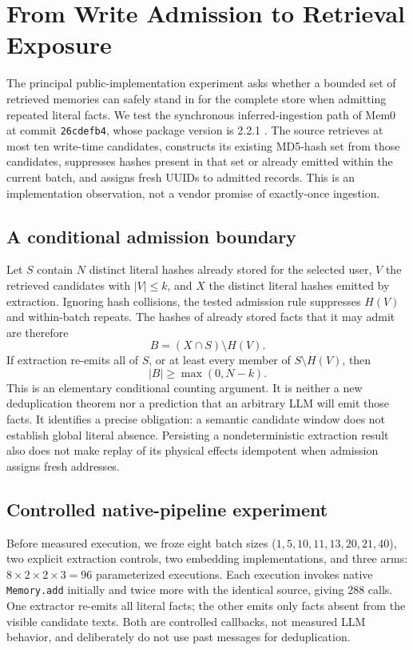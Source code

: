 \section{From Write Admission to Retrieval Exposure}
\label{sec:admission}
The principal public-implementation experiment asks whether a bounded set of retrieved memories can safely stand in for the complete store when admitting repeated literal facts. We test the synchronous inferred-ingestion path of Mem0 at commit \texttt{26cdefb4}, whose package version is 2.2.1 \cite{mem0contributors2026oss}. The source retrieves at most ten write-time candidates, constructs its existing MD5-hash set from those candidates, suppresses hashes present in that set or already emitted within the current batch, and assigns fresh UUIDs to admitted records. This is an implementation observation, not a vendor promise of exactly-once ingestion.

\subsection{A conditional admission boundary}
Let $S$ contain $N$ distinct literal hashes already stored for the selected user, $V$ the retrieved candidates with $|V|\leq k$, and $X$ the distinct literal hashes emitted by extraction. Ignoring hash collisions, the tested admission rule suppresses $H(V)$ and within-batch repeats. The hashes of already stored facts that it may admit are therefore
\begin{equation}
 B=(X\cap S)\setminus H(V).
 \label{eq:admission}
\end{equation}
If extraction re-emits all of $S$, or at least every member of $S\setminus H(V)$, then
\begin{equation}
 |B|\geq\max(0,N-k).
 \label{eq:capacity}
\end{equation}
This is an elementary conditional counting argument. It is neither a new deduplication theorem nor a prediction that an arbitrary LLM will emit those facts. It identifies a precise obligation: a semantic candidate window does not establish global literal absence. Persisting a nondeterministic extraction result also does not make replay of its physical effects idempotent when admission assigns fresh addresses.

\subsection{Controlled native-pipeline experiment}
Before measured execution, we froze eight batch sizes ($1,5,10,11,13,20,21,40$), two explicit extraction controls, two embedding implementations, and three arms: $8\times2\times2\times3=96$ parameterized executions. Each execution invokes native \texttt{Memory.add} initially and twice more with the identical source, giving 288 calls. One extractor re-emits all literal facts; the other emits only facts absent from the visible candidate texts. Both are controlled callbacks, not measured LLM behavior, and deliberately do not use past messages for deduplication.

